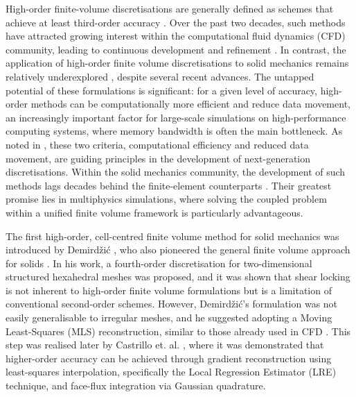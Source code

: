 \documentclass[sn-mathphys,Numbered]{sn-jnl}%
\begin{document}
%
%
%
%
High-order finite-volume discretisations are generally defined as schemes that achieve at least third-order accuracy \cite{wang2013}. Over the past two decades, such methods have attracted growing interest within the computational fluid dynamics (CFD) community, leading to continuous development and refinement \cite{Tsoutsanis2025, Nishikawa2025, Costa2022, Costa2023, Antoniadis2022}. In contrast, the application of high-order finite volume discretisations to solid mechanics remains relatively underexplored  \cite{Demirdzic2016, Castrillo2022, Castrillo2024}, despite several recent advances. The untapped potential of these formulations is significant: for a given level of accuracy, high-order methods can be computationally more efficient and reduce data movement, an increasingly important factor for large-scale simulations on high-performance computing systems, where memory bandwidth is often the main bottleneck. As noted in \cite{Tzanio2021}, these two criteria, computational efficiency and reduced data movement, are guiding principles in the development of next-generation discretisations. Within the solid mechanics community, the development of such methods lags decades behind the finite-element counterparts \cite{Bathe1996}. Their greatest promise lies in multiphysics simulations, where solving the coupled problem within a unified finite volume framework is particularly advantageous.

The first high-order, cell-centred finite volume method for solid mechanics was introduced by Demirdžić \cite{Demirdzic2016}, who also pioneered the general finite volume approach for solids \cite{Demirdzic1988, Cardiff2021}. In his work, a fourth-order discretisation for two-dimensional structured hexahedral meshes was proposed, and it was shown that shear locking is not inherent to high-order finite volume formulations but is a limitation of conventional second-order schemes. However, Demirdžić’s formulation was not easily generalisable to irregular meshes, and he suggested adopting a Moving Least-Squares (MLS) reconstruction, similar to those already used in CFD \cite{Felgueroso2007, Ramirez2014}. This step was realised later by Castrillo et. al. \cite{Castrillo2022, Castrillo2023}, where it was demonstrated that higher-order accuracy can be achieved through gradient reconstruction using least-squares interpolation, specifically the Local Regression Estimator (LRE) technique, and face-flux integration via Gaussian quadrature.
\end{document}
